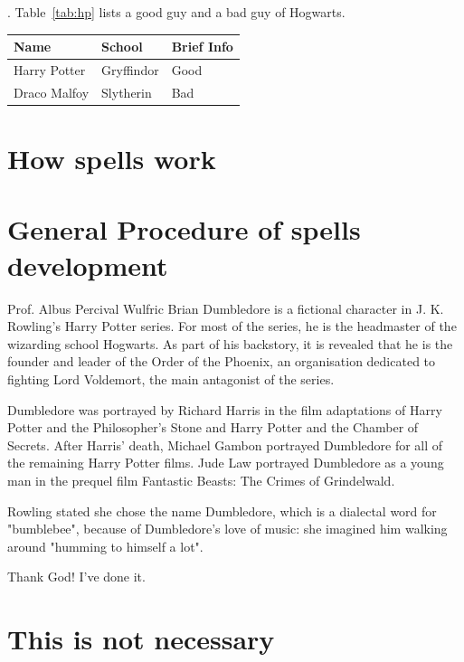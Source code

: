 \documentclass{swfuthesisen}
\begin{document}
\lipsum[][2]. Table~\ref{tab:hp} lists a good guy and a bad guy of Hogwarts. 

\begin{center}\singlespacing
  \begin{tabular}{lll}
    \toprule
    Name&School&Brief Info\\\midrule
    Harry Potter&Gryffindor&Good\\
    Draco Malfoy&Slytherin&Bad\\\bottomrule
  \end{tabular}      
\end{center}

\lipsum[7-15]

\chapter{How spells work}

\lipsum[16-30]

\chapter{General Procedure of spells development}
\label{cha:gener-proc-spells}

\lipsum[31-45]

\appendix %

\makebib %

\begin{advisorInfo} %
  
  Prof. Albus Percival Wulfric Brian Dumbledore is a fictional character in
  J. K. Rowling's Harry Potter series. For most of the series, he is the headmaster of the
  wizarding school Hogwarts. As part of his backstory, it is revealed that he is the
  founder and leader of the Order of the Phoenix, an organisation dedicated to fighting
  Lord Voldemort, the main antagonist of the series.

  Dumbledore was portrayed by Richard Harris in the film adaptations of Harry Potter and
  the Philosopher's Stone and Harry Potter and the Chamber of Secrets. After Harris'
  death, Michael Gambon portrayed Dumbledore for all of the remaining Harry Potter
  films. Jude Law portrayed Dumbledore as a young man in the prequel film Fantastic
  Beasts: The Crimes of Grindelwald.

  Rowling stated she chose the name Dumbledore, which is a dialectal word for "bumblebee",
  because of Dumbledore's love of music: she imagined him walking around "humming to
  himself a lot".

\end{advisorInfo}

\begin{acknowledgment} %
  Thank God! I've done it.
\end{acknowledgment}

\singlespacing

\chapter{This is not necessary}

\lipsum[50-60]
\end{document}
